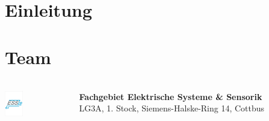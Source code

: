 \section{Einleitung}

\section{Team}

\begin{frame}
    \frametitle{\insertsection}
    \vfill
    \begin{columns}
        \begin{column}[c]{0.2\textwidth}
            \includegraphics[height=3em]{fig/logo_ess}  
        \end{column}
        \begin{column}[c]{0.7\textwidth}
            \textbf{Fachgebiet Elektrische Systeme \& Sensorik}\\
            LG3A, 1. Stock, Siemens-Halske-Ring 14, Cottbus
        \end{column}
    \end{columns}
    
    \vfill


\end{frame}
